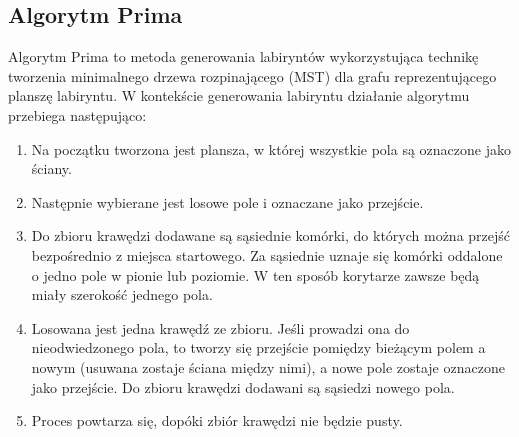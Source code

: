 \subsection{Algorytm Prima}

Algorytm Prima to metoda generowania labiryntów wykorzystująca technikę tworzenia minimalnego drzewa rozpinającego (MST) dla grafu reprezentującego planszę labiryntu.
W kontekście generowania labiryntu działanie algorytmu przebiega następująco:

\begin{enumerate}
    \item Na początku tworzona jest plansza, w której wszystkie pola są oznaczone jako ściany.
    
    

    \item Następnie wybierane jest losowe pole i oznaczane jako przejście.
    
    

    \clearpage

    \item Do zbioru krawędzi dodawane są sąsiednie komórki, do których można przejść bezpośrednio z miejsca startowego. Za sąsiednie uznaje się komórki oddalone o jedno pole w pionie lub poziomie. W ten sposób korytarze zawsze będą miały szerokość jednego pola.
    
    

    \item Losowana jest jedna krawędź ze zbioru. Jeśli prowadzi ona do nieodwiedzonego pola, to tworzy się przejście pomiędzy bieżącym polem a nowym (usuwana zostaje ściana między nimi), a nowe pole zostaje oznaczone jako przejście. Do zbioru krawędzi dodawani są sąsiedzi nowego pola.

    

    \item Proces powtarza się, dopóki zbiór krawędzi nie będzie pusty.
    
    
\end{enumerate}

\clearpage